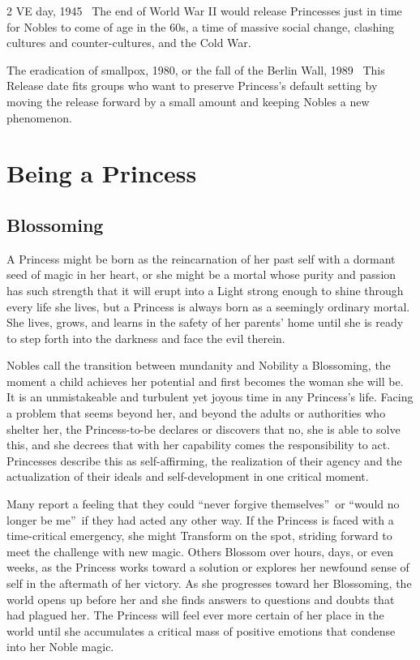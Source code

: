 \begin{multicols}{2}
\textbullet VE day, 1945 \textemdash\, The end of World War II would release Princesses just in time for Nobles to come of age in the 60s, a time of massive social change, clashing cultures and counter-cultures, and the Cold War.

\textbullet The eradication of smallpox, 1980, or the fall of the Berlin Wall, 1989 \textemdash\, This Release date fits groups who want to preserve Princess's default setting by moving the release forward by a small amount and keeping Nobles a new phenomenon.

\bigsidebarend

\section*{Being a Princess}
\label{sec:BeingAPrincess}

\subsection*{Blossoming}

A Princess might be born as the reincarnation of her past self with a dormant seed of magic in her heart, or she might be a mortal whose purity and passion has such strength that it will erupt into a Light strong enough to shine through every life she lives, but a Princess is always born as a seemingly ordinary mortal. She lives, grows, and learns in the safety of her parents' home until she is ready to step forth into the darkness and face the evil therein. 

Nobles call the transition between mundanity and Nobility a Blossoming, the moment a child achieves her potential and first becomes the woman she will be. It is an unmistakeable and turbulent yet joyous time in any Princess's life. Facing a problem that seems beyond her, and beyond the adults or authorities who shelter her, the Princess-to-be declares or discovers that no, she is able to solve this, and she decrees that with her capability comes the responsibility to act. Princesses describe this as self-affirming, the realization of their agency and the actualization of their ideals and self-development in one critical moment. 

Many report a feeling that they could \textquotedblleft never forgive themselves\textquotedblright\, or \textquotedblleft would no longer be me\textquotedblright\, if they had acted any other way. If the Princess is faced with a time-critical emergency, she might Transform on the spot, striding forward to meet the challenge with new magic. Others Blossom over hours, days, or even weeks, as the Princess works toward a solution or explores her newfound sense of self in the aftermath of her victory. As she progresses toward her Blossoming, the world opens up before her and she finds answers to questions and doubts that had plagued her. The Princess will feel ever more certain of her place in the world until she accumulates a critical mass of positive emotions that condense into her Noble magic.


\end{multicols}
